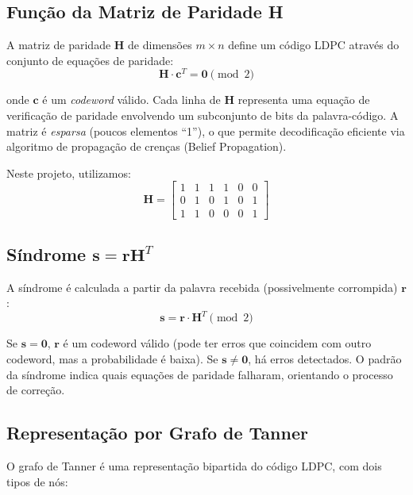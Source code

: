 \documentclass[conference]{IEEEtran}
\begin{document}
\subsection{Função da Matriz de Paridade H}

A matriz de paridade $\mathbf{H}$ de dimensões $m \times n$ define um código LDPC através do conjunto de equações de paridade:
\begin{equation}
    \mathbf{H} \cdot \mathbf{c}^T = \mathbf{0} \pmod{2}
\end{equation}

onde $\mathbf{c}$ é um \textit{codeword} válido. Cada linha de $\mathbf{H}$ representa uma equação de verificação de paridade envolvendo um subconjunto de bits da palavra-código. A matriz é \textit{esparsa} (poucos elementos ``1''), o que permite decodificação eficiente via algoritmo de propagação de crenças (Belief Propagation).

Neste projeto, utilizamos:
\begin{equation}
    \mathbf{H} = \begin{bmatrix}
    1 & 1 & 1 & 1 & 0 & 0 \\
    0 & 1 & 0 & 1 & 0 & 1 \\
    1 & 1 & 0 & 0 & 0 & 1
    \end{bmatrix}
\end{equation}

\subsection{Síndrome $\mathbf{s} = \mathbf{rH}^T$}

A síndrome é calculada a partir da palavra recebida (possivelmente corrompida) $\mathbf{r}$:
\begin{equation}
    \mathbf{s} = \mathbf{r} \cdot \mathbf{H}^T \pmod{2}
\end{equation}

Se $\mathbf{s} = \mathbf{0}$, $\mathbf{r}$ é um codeword válido (pode ter erros que coincidem com outro codeword, mas a probabilidade é baixa). Se $\mathbf{s} \neq \mathbf{0}$, há erros detectados. O padrão da síndrome indica quais equações de paridade falharam, orientando o processo de correção.

\subsection{Representação por Grafo de Tanner}

O grafo de Tanner é uma representação bipartida do código LDPC, com dois tipos de nós:
\end{document}
